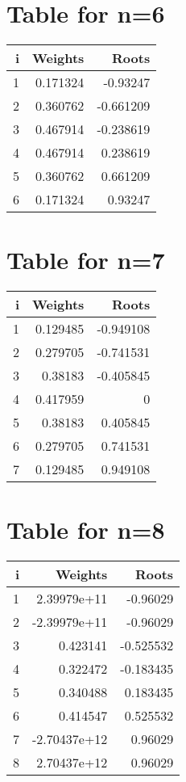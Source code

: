 \documentclass{article}
\begin{document}
\section*{Table for n=6}
\begin{tabular}{rrr}
\hline
   i &   Weights &     Roots \\
\hline
   1 &  0.171324 & -0.93247  \\
   2 &  0.360762 & -0.661209 \\
   3 &  0.467914 & -0.238619 \\
   4 &  0.467914 &  0.238619 \\
   5 &  0.360762 &  0.661209 \\
   6 &  0.171324 &  0.93247  \\
\hline
\end{tabular}

\section*{Table for n=7}
\begin{tabular}{rrr}
\hline
   i &   Weights &     Roots \\
\hline
   1 &  0.129485 & -0.949108 \\
   2 &  0.279705 & -0.741531 \\
   3 &  0.38183  & -0.405845 \\
   4 &  0.417959 &  0        \\
   5 &  0.38183  &  0.405845 \\
   6 &  0.279705 &  0.741531 \\
   7 &  0.129485 &  0.949108 \\
\hline
\end{tabular}

\section*{Table for n=8}
\begin{tabular}{rrr}
\hline
   i &      Weights &     Roots \\
\hline
   1 &  2.39979e+11 & -0.96029  \\
   2 & -2.39979e+11 & -0.96029  \\
   3 &  0.423141    & -0.525532 \\
   4 &  0.322472    & -0.183435 \\
   5 &  0.340488    &  0.183435 \\
   6 &  0.414547    &  0.525532 \\
   7 & -2.70437e+12 &  0.96029  \\
   8 &  2.70437e+12 &  0.96029  \\
\hline
\end{tabular}
\end{document}
